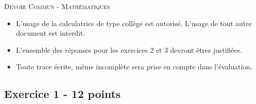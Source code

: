 




{\Large \textsc{Devoir Commun - Mathématiques}}

\begin{itemize}
    \item L'usage de la calculatrice de type collège est autorisé. L'usage de tout autre document est interdit. 
    \item L'ensemble des réponses pour les exercices 2 et 3 devront êtres justifiées.
    \item Toute trace écrite, même incomplète sera prise en compte dans l'évaluation.
  \end{itemize}

\horrule{2px}

\subsection*{Exercice 1 - 12 points}

